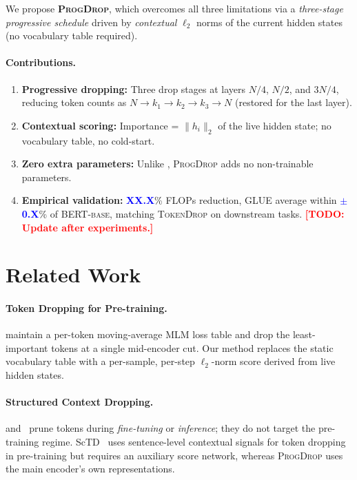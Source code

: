 \documentclass[11pt]{article}
\newcommand{\model}{\textsc{ProgDrop}}          %
\newcommand{\baseline}{\textsc{TokenDrop}}      %
\newcommand{\bertbase}{\textsc{BERT-base}}       %
\newcommand{\norm}[1]{\lVert #1 \rVert_2}       %
\newcommand{\TODO}[1]{\textcolor{red}{\textbf{[TODO: #1]}}}
\newcommand{\RESULT}[1]{\textcolor{blue}{\textbf{#1}}}  %
\begin{document}
We propose \textbf{\model{}}, which overcomes all three limitations via a
\emph{three-stage progressive schedule} driven by \emph{contextual} $\ell_2$
norms of the current hidden states (no vocabulary table required).

\paragraph{Contributions.}
\begin{enumerate}
  \item \textbf{Progressive dropping:} Three drop stages at layers $N/4$,
        $N/2$, and $3N/4$, reducing token counts as
        $N \to k_1 \to k_2 \to k_3 \to N$ (restored for the last layer).
  \item \textbf{Contextual scoring:} Importance = $\norm{h_i}$ of the live
        hidden state; no vocabulary table, no cold-start.
  \item \textbf{Zero extra parameters:} Unlike \citealt{hou2022tokendrop},
        \model{} adds no non-trainable parameters.
  \item \textbf{Empirical validation:} \RESULT{XX.X}\% FLOPs reduction,
        GLUE average within \RESULT{$\pm$0.X}\% of \bertbase{}, matching
        \baseline{} on downstream tasks.
  \TODO{Update after experiments.}
\end{enumerate}

\section{Related Work}
\label{sec:related}

\paragraph{Token Dropping for Pre-training.}
\citet{hou2022tokendrop} maintain a per-token moving-average MLM loss
table and drop the least-important tokens at a single mid-encoder cut.
Our method replaces the static vocabulary table with a per-sample, per-step
$\ell_2$-norm score derived from live hidden states.

\paragraph{Structured Context Dropping.}
\citet{zhu2021ltp} and~\citet{modarressi2022adapterdrop} prune tokens during
\emph{fine-tuning} or \emph{inference}; they do not target the pre-training
regime.
ScTD~\citep{zhang2023sctd} uses sentence-level contextual signals for token
dropping in pre-training but requires an auxiliary score network, whereas
\model{} uses the main encoder's own representations.
\end{document}
